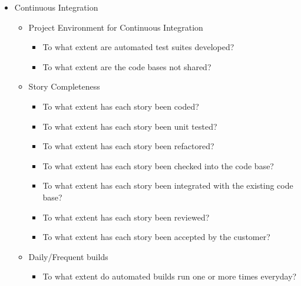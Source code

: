 \begin{itemize}
\begin{itemize}
\begin{itemize}
				\end{itemize}
		\end{itemize}
	\item Continuous Integration
		\begin{itemize}
			\item Project Environment for Continuous Integration 
				\begin{itemize}
					\item To what extent are automated test suites developed?
					\item To what extent are the code bases not shared?
				\end{itemize}
			\item Story Completeness
				\begin{itemize}
					\item To what extent has each story been coded? 
					\item To what extent has each story been unit tested? 
					\item To what extent has each story been refactored? 
					\item To what extent has each story been checked into the code base? 
					\item To what extent has each story been integrated with the existing code base? 
					\item To what extent has each story been reviewed? 
					\item To what extent has each story been accepted by the customer? 
				\end{itemize}
			\item Daily/Frequent builds
				\begin{itemize}
					\item To what extent do automated builds run one or more times everyday?
				\end{itemize}
		\end{itemize}


\end{itemize}
